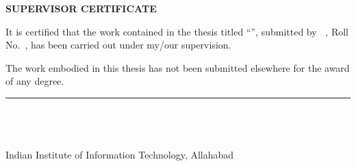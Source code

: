 
\clearpage
\thispagestyle{empty}
\noindent{}

\vspace{8mm}
\begin{center}
    {\large\bfseries SUPERVISOR CERTIFICATE}
\end{center}
\vspace{6mm}

\noindent It is certified that the work contained in the thesis titled ``\textbf{\ttitle}'', submitted by \textbf{\authorprefix\ \studentonename}, Roll No.\ \textbf{\studentoneroll}, has been carried out under my/our supervision.

\vspace{5mm}
\noindent The work embodied in this thesis has not been submitted elsewhere for the award of any degree.

\vfill

\hfill\begin{minipage}{8cm}
    \rule{\textwidth}{0.4pt}\\[2mm]
    \textbf{\supname}\\
    \deptname\\
    Indian Institute of Information Technology, Allahabad
\end{minipage}

\vspace{15mm}


